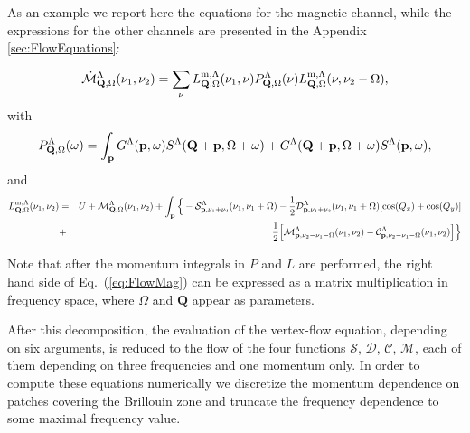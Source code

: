 As an example we report here the equations for the magnetic channel, while the expressions for the other channels are presented in the Appendix \ref{sec:FlowEquations}:
\begin{widetext}
\begin{equation}
 \dot{\mathcal{M}}^{\Lambda}_{\mathbf{Q},\Omega}(\nu_1,\nu_2) = 
 \sum_\nu L^{\mathrm{m},\Lambda}_{\mathbf{Q},\Omega}(\nu_1,\nu) 
 P_{\mathbf{Q},\Omega}^{\Lambda}(\nu) 
 L^{\mathrm{m},\Lambda}_{\mathbf{Q},\Omega}(\nu,\nu_2-\Omega), 
\label{eq:FlowMag}
\end{equation} 	   
with
\begin{equation}
 P_{\mathbf{Q},\Omega}^{\Lambda}(\omega) = \int_{\mathbf{p}}
 G^\Lambda(\mathbf{p},\omega) S^\Lambda(\mathbf{Q}+\mathbf{p},\Omega+\omega) +
 G^\Lambda(\mathbf{Q}+\mathbf{p},\Omega+\omega) S^\Lambda(\mathbf{p},\omega),
\label{eq:Pph} 
\end{equation} 
and
\begin{eqnarray} 
\nonumber
 L^{\mathrm{m},\Lambda}_{\mathbf{Q},\Omega}(\nu_1,\nu_2)
 &=& U + \mathcal{M}^\Lambda_{\mathbf{Q},\Omega}(\nu_1,\nu_2) 
 + \int_{\mathbf{p}} \Big \{- \mathcal{S}^\Lambda_{\mathbf{p},\nu_1+\nu_2}(\nu_1,\nu_1+\Omega)  
 -\frac{1}{2} \mathcal{D}^\Lambda_{\mathbf{p},\nu_1+\nu_2}(\nu_1,\nu_1+\Omega)
 [\cos(Q_x)+\cos(Q_y)] \\
 &+&\frac{1}{2} \Big[  \mathcal{M}^\Lambda_{\mathbf{p},\nu_2-\nu_1-\Omega}( \nu_1,\nu_2) 
 - \mathcal{C}^\Lambda_{\mathbf{p},\nu_2-\nu_1-\Omega}(\nu_1,\nu_2) \Big] 
 \Big \}
\label{eq:Lxph} 
\end{eqnarray}
\end{widetext}
Note that after the momentum integrals in $P$ and $L$ are performed, the right hand side of Eq.~(\ref{eq:FlowMag}) can be expressed as a matrix multiplication in frequency space, where $\Omega$ and $\mathbf{Q}$ appear as parameters.

After this decomposition, the evaluation of the vertex-flow equation, depending on six arguments, is reduced to the flow of the four functions $\mathcal{S}$, $\mathcal{D}$, $\mathcal{C}$, $\mathcal{M}$, each of them depending on three frequencies and one momentum only. In order to compute these equations numerically we discretize the momentum dependence on patches covering the Brillouin zone and truncate the frequency dependence to some maximal frequency value.

